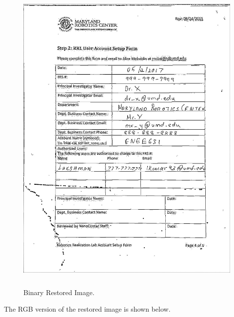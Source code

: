 \begin{figure}[th]
	\centering
	\includegraphics[height=16cm ]{Figures/thresholded_restored_image}
	\caption[Binary Restored Image]{Binary Restored Image.}
	\label{fig:BinaryRestoredImage}
\end{figure}

\pagebreak

The RGB version of the restored image is shown below. \\  \\

